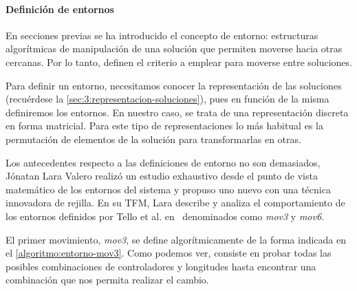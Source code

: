 \paragraph{Definición de entornos} \label{paragraph:entornos}
En secciones previas se ha introducido el concepto de entorno: estructuras algorítmicas de manipulación de una solución que permiten moverse hacia otras cercanas. Por lo tanto, definen el criterio a emplear para moverse entre soluciones.

Para definir un entorno, necesitamos conocer la representación de las soluciones (recuérdese la \autoref{sec:3:representacion-soluciones}), pues en función de la misma definiremos los entornos. En nuestro caso, se trata de una representación discreta en forma matricial. Para este tipo de representaciones lo más habitual es la permutación de elementos de la solución para transformarlas en otras.

Los antecedentes respecto a las definiciones de entorno no son demasiados, Jónatan Lara Valero realizó un estudio exhaustivo desde el punto de vista matemático de los entornos del sistema \legacy{} y propuso uno nuevo con una técnica innovadora de rejilla. En su TFM, Lara describe y analiza el comportamiento de los entornos definidos por Tello et al. en~\cite{articulo1} denominados como \textit{mov3} y \textit{mov6}.

El primer movimiento, \textit{mov3}, se define algorítmicamente de la forma indicada en el \autoref{algoritmo:entorno-mov3}. Como podemos ver, consiste en probar todas las posibles combinaciones de controladores y longitudes hasta encontrar una combinación que nos permita realizar el cambio.


